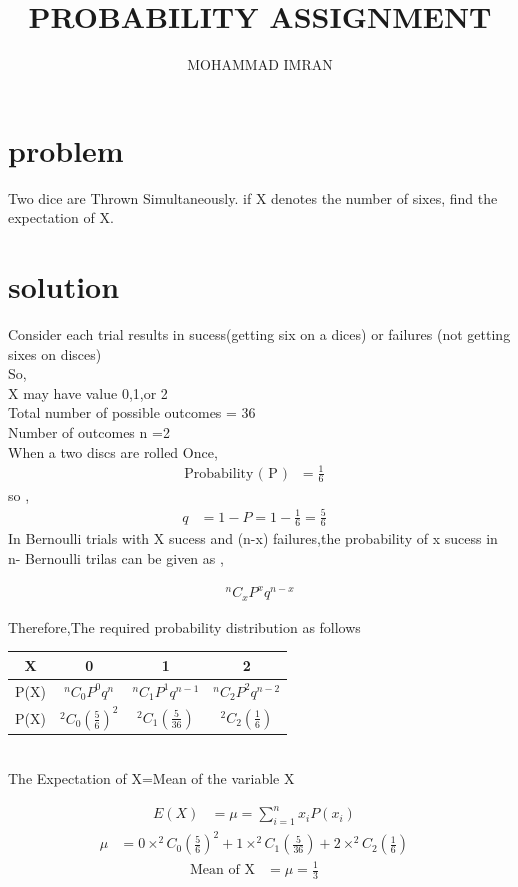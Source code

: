 \documentclass[journal,12pt,two column]{article}
\title{PROBABILITY ASSIGNMENT}
\author{MOHAMMAD IMRAN}
\begin{document}
\maketitle
\bigskip


 \section{problem }
  Two dice are Thrown Simultaneously. if X denotes the number of sixes, find the
expectation of X.

\section{solution }
Consider each trial results in sucess(getting six on a dices) or failures (not getting sixes on disces)\\
So,\\
X may have value 0,1,or 2\\
Total number of possible outcomes = 36\\
Number of outcomes n =2\\
When a  two discs are rolled Once,\\


\begin{align}
\text{Probability ( P )} &=
\frac{1}{6}&\label{1}
 \end{align}
 so ,
 \begin{align}
  q &= 1-P = 1-\frac{1}{6} = \frac{5}{6}&\label{2}
 \end{align}
 In Bernoulli trials with X sucess and (n-x) failures,the probability of x sucess in n- Bernoulli trilas can be given as ,
 
\begin{align}
 &^nC_xP^xq^{n-x}&\label{3}
\end{align}

Therefore,The required probability distribution as follows\\

 \begin{tabular}{ |c |c |c |c |}
 \hline
 X  &  0  &  1  &  2\\
 \hline
 
 P(X)  &  $^nC_0P^0q^n$  &  $^nC_1P^1q^{n-1}$  &  $^nC_2P^2q^{n-2}$\\
 \hline
 
 P(X)  &   $^2C_0(\frac{5}{6})^2$ &  $^2C_1(\frac{5}{36})$ &   $^2C_2(\frac{1}{6})$ \\
 \hline
 
 \end{tabular}\\
 
 
 The Expectation of X=Mean of the variable X 
 
 \begin{align}
  E(X)&=\mu=\sum_{i=1}^{n} x_i P(x_i)&\label{4}
\end{align}
\begin{align}
\mu&=0\times^2C_0(\frac{5}{6})^2+1\times^2C_1(\frac{5}{36})+2\times^2C_2(\frac{1}{6})&\label{5}
\end{align}
\begin{align}
 \text{Mean of X}&=\mu=\frac{1}{3}&\label{6}
 \end{align}
 
\end{document}

